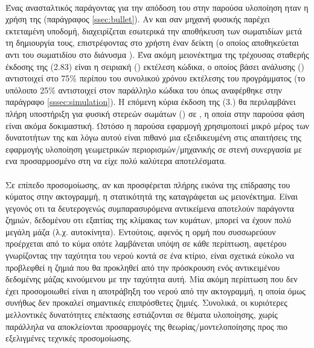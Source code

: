 \paragraph{} Ένας ανασταλτικός παράγοντας για την απόδοση του  στην παρούσα
υλοποίηση ηταν η χρήση της  (παράγραφος \ref{ssec:bullet}). Αν και σαν μηχανή
φυσικής παρέχει εκτεταμένη υποδομή, διαχειρίζεται εσωτερικά την αποθήκευση των σωματιδίων
μετά τη δημιουργία τους, επιστρέφοντας στο χρήστη έναν δείκτη (ο οποίος αποθηκεύεται αντι
του σωματιδίου στο διάνυσμα ). Ένα ακόμη μειονέκτημα της τρέχουσας σταθερής
έκδοσης της  (2.83) είναι η σειριακή () εκτέλεση κώδικα, ο
οποίος βάσει ανάλυσης () αντιστοιχεί στο 75\% περίπου του συνολικού χρόνου
εκτέλεσης του προγράμματος (το υπόλοιπο 25\% αντιστοιχεί στον παράλληλο κώδικα του
 όπως αναφέρθηκε στην παράγραφο \ref{sssec:simulation}). Η επόμενη κύρια έκδοση
της  (3.) θα περιλαμβάνει πλήρη υποστήριξη για φυσική στερεών σωμάτων
() σε , η οποία στην παρούσα φάση είναι ακόμα
δοκιμαστική. Ωστόσο η παρούσα εφαρμογή χρησιμοποιεί μικρό μέρος των δυνατοτήτων της
 και λόγω αυτού είναι πιθανό μια εξειδικευμένη στις απαιτήσεις της εφαρμογής
υλοποίηση γεωμετρικών περιορισμών/μηχανικής σε στενή συνεργασία με ενα προσαρμοσμένο στη
  να είχε πολύ καλύτερα αποτελέσματα.

\paragraph{} Σε επίπεδο προσομοίωσης, αν και προσφέρεται πλήρης εικόνα της επίδρασης του
κύματος στην ακτογραμμή, η στατικότητά της καταγράφεται ως μειονέκτημα. Είναι γεγονός οτι
τα δευτερογενώς συμπαρασυρόμενα αντικείμενα αποτελούν παράγοντα ζημιών, δεδομένου οτι
εξαιτίας της κλίμακας των κυμάτων, μπορεί να έχουν πολύ μεγάλη μάζα
(λ.χ. αυτοκίνητα). Εντούτοις, αφενός η ορμή που συσσωρεύουν προέρχεται από το κύμα οπότε
λαμβάνεται υπόψη σε κάθε περίπτωση, αφετέρου γνωρίζοντας την ταχύτητα του νερού κοντά σε
ένα κτίριο, είναι σχετικά εύκολο να προβλεφθεί η ζημιά που θα προκληθεί από την πρόσκρουση
ενός αντικειμένου δεδομένης μάζας κινούμενου με την ταχύτητα αυτή. Μία ακόμη περίπτωση που
δεν έχει προσομοιωθεί είναι η αποτράβηξη του νερού από την ακτογραμμή, η οποία όμως
συνήθως δεν προκαλεί σημαντικές επιπρόσθετες ζημιές. Συνολικά, οι κυριότερες μελλοντικές
δυνατότητες επέκτασης εστιάζονται σε θέματα υλοποίησης, χωρίς παράλληλα να αποκλείονται
προσαρμογές της θεωρίας/μοντελοποίησης προς πιο εξελιγμένες τεχνικές προσομοίωσης.

